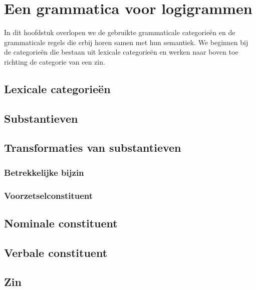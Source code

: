 \chapter{Een grammatica voor logigrammen}

In dit hoofdstuk overlopen we de gebruikte grammaticale categorieën en de grammaticale regels die erbij horen samen met hun semantiek. We beginnen bij de categorieën die bestaan uit lexicale categorieën en werken naar boven toe richting de categorie van een zin.

\section{Lexicale categorieën}

\section{Substantieven}
\section{Transformaties van substantieven}
\subsection{Betrekkelijke bijzin}
\subsection{Voorzetselconstituent}
\section{Nominale constituent}

\section{Verbale constituent}
\section{Zin}
